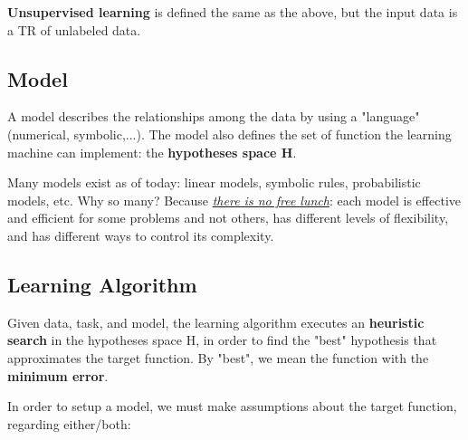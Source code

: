 \textbf{Unsupervised learning} is defined the same as the above, but the input data is a TR of unlabeled data.



\subsection{Model}

A model describes the relationships among the data by using a "language" (numerical, symbolic,...). The model also defines the set of function the learning machine can implement: the \textbf{hypotheses space H}. 

Many models exist as of today: linear models, symbolic rules, probabilistic models, etc. Why so many? Because \href{https://en.wikipedia.org/wiki/No_free_lunch_theorem}{\textit{there is no free lunch}}: each model is effective and efficient for some problems and not others, has different levels of flexibility, and has different ways to control its complexity.

\subsection{Learning Algorithm}

Given data, task, and model, the learning algorithm executes an \textbf{heuristic search} in the hypotheses space H, in order to find the "best" hypothesis that approximates the target function. By "best", we mean the function with the \textbf{minimum error}.

In order to setup a model, we must make assumptions about the target function, regarding either/both:


